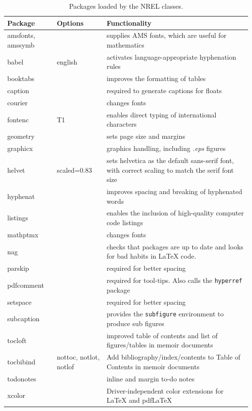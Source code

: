 \begin{table}[!h]
\centering
\caption[Packages loaded by the NREL classes]{Packages loaded by the NREL classes.}
\label{Tab:Packages}
\begin{tabular*}{\textwidth}{llp{}}
\toprule
Package & Options & Functionality\\
\midrule
amsfonts, amssymb & & supplies AMS fonts, which are useful for mathematics \\
babel & english & activates language-appropriate hyphenation rules\\
booktabs & & improves the formatting of tables \\
caption & & required to generate captions for floats\\
courier& & changes fonts \\
fontenc & T1 & enables direct typing of international characters \\
geometry & & sets page size and margins \\
graphicx & & graphics handling, including \emph{.eps} figures \\
helvet& scaled=0.83 & sets helvetica as the default sans-serif font, with correct scaling to match the serif font size\\
hyphenat & & improves spacing and breaking of hyphenated words \\
listings & & enables the inclusion of high-quality computer code listings\\
mathptmx& & changes fonts \\
nag & & checks that packages are up to date and looks for bad habits in LaTeX code. \\
parskip & & required for better spacing\\
pdfcomment & & required for tool-tips. Also calls the \texttt{hyperref} package  \\
setspace & & required for better spacing\\
subcaption & & provides the \texttt{subfigure} environment to produce sub figures \\
tocloft & & improved table of contents and list of figures/tables in memoir documents\\
tocbibind & nottoc, notlot, notlof & Add bibliography/index/contents to Table of Contents in memoir documents\\
todonotes & & inline and margin to-do notes \\
xcolor & & Driver-independent color extensions for LaTeX and pdfLaTeX\\
\bottomrule
\end{tabular*}
\end{table}

